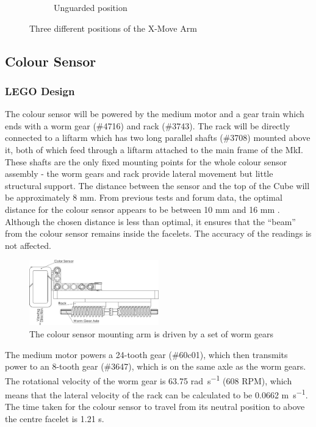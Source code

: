\documentclass{report}
\newcommand{\legopiece}[1]{(\##1)}
\newcommand{\lego}{LEGO }
\begin{document}
\begin{figure}[H]
\begin{subfigure}[b]{0.30811\textwidth}
			\caption{Unguarded position}
			\label{fig:rdrXMoveArmV1_3}
		\end{subfigure}
		\caption{Three different positions of the X-Move Arm}
		\label{fig:rdrXMoveArmV1}
	\end{figure}
	

	\subsection{Colour Sensor}
	
	\subsubsection{\lego Design}
	
	The colour sensor will be powered by the medium motor and a gear train which ends with a worm gear \legopiece{4716} and rack \legopiece{3743}. The rack will be directly connected to a liftarm which has two long parallel shafts \legopiece{3708} mounted above it, both of which feed through a liftarm attached to the main frame of the MkI. These shafts are the only fixed mounting points for the whole colour sensor assembly - the worm gears and rack provide lateral movement but little structural support. The distance between the sensor and the top of the Cube will be approximately 8 \si{\milli\metre}. From previous tests and forum data, the optimal distance for the colour sensor appears to be between 10 \si{\milli\metre} and 16 \si{\milli\metre} \cite{UlfR2015}. Although the chosen distance is less than optimal, it ensures that the \enquote{beam} from the colour sensor remains inside the facelets. The accuracy of the readings is not affected.
	
	\begin{figure}[H]
		\centering
		\includegraphics[width=0.5\textwidth]{Resources/Images/dwgColorSensor.png}
		\caption{The colour sensor mounting arm is driven by a set of worm gears}
		\label{fig:dwgColorSensor}
	\end{figure}
	
	The medium motor powers a 24-tooth gear \legopiece{60c01}, which then transmits power to an 8-tooth gear \legopiece{3647}, which is on the same axle as the worm gears. The rotational velocity of the worm gear is 63.75 \si{\radian\per\second} (608 RPM), which means that the lateral velocity of the rack can be calculated to be 0.0662 \si{\meter\per\second}. The time taken for the colour sensor to travel from its neutral position to above the centre facelet is 1.21 \si{\second}.
	
\end{document}
